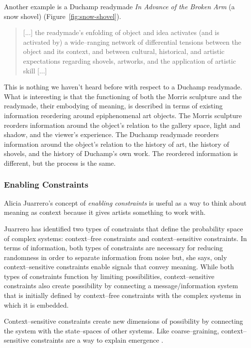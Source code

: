 \documentclass[letter:wpaper]{article}
\begin{document}
    Another example is a Duchamp readymade \emph{In Advance of the Broken Arm} (a snow shovel) (Figure~\ref{fig:snow-shovel}).

    \begin{quote}
        [...] the readymade's enfolding of object and idea activates (and is activated by) a wide–ranging network of differential tensions between the object and its context, and between cultural, historical, and artistic expectations regarding shovels, artworks, and the application of artistic skill [...] \citep[p.187]{HoelscherArtAsInfrmtn2021}
    \end{quote}

    This is nothing we haven't heard before with respect to a Duchamp readymade. What is interesting is that the functioning of both the Morris sculpture and the readymade, their embodying of meaning, is described in terms of existing information reordering around epiphenomenal art objects. The Morris sculpture reorders information around the object's relation to the gallery space, light and shadow, and the viewer's experience. The Duchamp readymade reorders information around the object's relation to the history of art, the history of shovels, and the history of Duchamp's own work. The reordered information is different, but the process is the same.

    \subsubsection{Enabling Constraints}

    Alicia Juarrero's concept of \emph{enabling constraints} is useful as a way to think about meaning as context because it gives artists something to work with.
    
    Juarrero has identified two types of constraints that define the probability space of complex systems: context–free constraints and context–sensitive constraints. In terms of information, both types of constraints are necessary for reducing randomness in order to separate information from noise but, she says, only context–sensitive constraints enable signals that convey meaning. While both types of constraints function by limiting possibilities, context–sensitive constraints also create possibility by connecting a message/information system that is initially defined by context–free constraints with the complex systems in which it is embedded.
    
    Context–sensitive constraints create new dimensions of possibility by connecting the system with the state–spaces of other systems. Like coarse–graining, context–sensitive constraints are a way to explain emergence \citep[p.193]{JuarreroThSlfOrgnstnOfIntntnlActn2004} \citep[p.240]{JuarreroCsltyAsCnstrnt1998}.
\end{document}
